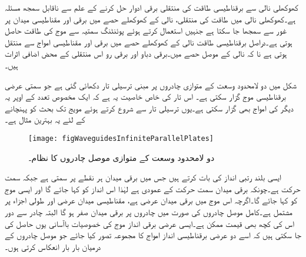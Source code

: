 کھوکھلی نالی سے برقناطیسی طاقت کی منتقلی برقی ادوار حل کرنے کے علم سے ناقابل سمجھ مسئلہ ہے۔کھوکھلی نالی میں طاقت کی منتقلی، نالی کے کھوکھلے حصے میں برقی اور مقناطیسی میدان پر غور سے سمجھا جا سکتا ہے جنہیں استعمال کرتے ہوئے  پوئنٹنگ سمتیہ سے موج کی طاقت حاصل ہوتی ہے۔دراصل برقناطیسی طاقت نالی کے کھوکھلے حصے میں برقی اور مقناطیسی امواج سے منتقل ہوتی ہے نا کہ نالی کے موصل حصے میں۔برقی دباو اور برقی رو اس منتقلی کے محض اضافی اثرات ہیں۔ 

شکل  میں دو لامحدود وسعت کے متوازی چادروں پر مبنی ترسیلی تار دکھائی گئی ہے جو  سمتی عرضی برقناطیسی موج گزار سکتی
 ہے۔ اس تار کی خاص خاصیت یہ ہے کہ ایک مخصوص تعدد کے اوپر یہ دیگر  کی امواج بھی گزار سکتی ہے۔یوں ترسیلی تار سے شروع کرتے ہوئے مویج تک بحث کو پہنچانے  کے لئے یہ بہترین مثال ہے۔

\begin{figure}
\centering
\texttt{[image: figWaveguidesInfiniteParallelPlates]}
\caption{دو لامحدود وسعت کے متوازی موصل چادروں کا نظام۔}
\label{شکل_مویج_لامحدود_متوازی_چادر}
\end{figure}

ایسی بلند رتبی انداز کی بات کرتے ہیں جس میں برقی میدان ہر نقطے پر  سمتی ہے جبکہ سمت حرکت  ہے۔چونکہ برقی میدان سمت حرکت کے عمودی ہے لہٰذا اس انداز کو   کہا جائے گا اور ایسی موج کو  کہا جائے گا۔اگرچہ اس موج میں برقی میدان عرضی ہے، مقناطیسی میدان عرضی اور طولی اجزاء پر مشتمل ہے۔کامل موصل چادروں کی صورت میں چادروں پر برقی میدان صفر ہو گا البتہ چادر سے دور  اس کی کچھ بھی قیمت ممکن ہے۔ایسی عرضی برقی انداز موج کی خصوصیات باآسانی یوں حاصل کی جا سکتی ہیں کہ اسے دو عرضی برقناطیسی انداز  امواج کا مجموعہ تصور کیا جائے جو موصل چادروں کے درمیان بار بار انعکاس کرتی ہوں۔

